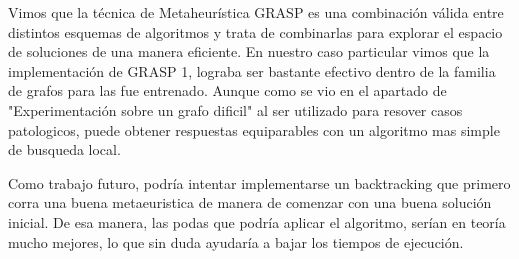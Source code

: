 Vimos que la técnica de Metaheurística GRASP es una combinación válida entre distintos esquemas de algoritmos y trata de combinarlas para explorar el espacio de soluciones de una manera eficiente. En nuestro caso particular vimos que la implementación de GRASP 1, lograba ser bastante efectivo dentro de la familia de grafos para las fue entrenado. Aunque como se vio en el apartado de "Experimentación sobre un grafo dificil" al ser utilizado para resover casos patologicos, puede obtener respuestas equiparables con un algoritmo mas simple de busqueda local.

Como trabajo futuro, podría intentar implementarse un backtracking que primero corra una buena metaeuristica de manera de comenzar con una buena solución inicial. De esa manera, las podas que podría aplicar el algoritmo, serían en teoría mucho mejores, lo que sin duda ayudaría a bajar los tiempos de ejecución.